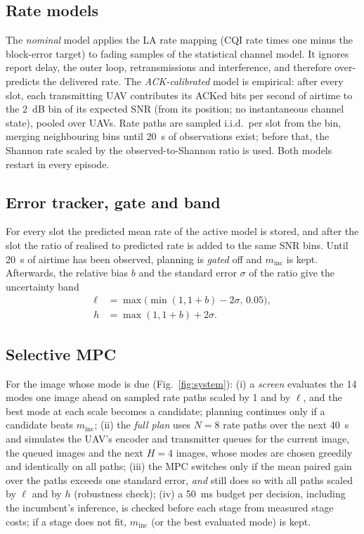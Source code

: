 \documentclass[final,3p,times,twocolumn]{elsarticle}
\begin{document}
\subsection{Rate models}
The \emph{nominal} model applies the LA rate mapping (CQI rate times one minus the block-error target) to fading
samples of the statistical channel model. It ignores report delay, the outer loop, retransmissions and interference,
and therefore over-predicts the delivered rate. The \emph{ACK-calibrated} model is empirical: after every slot, each
transmitting UAV contributes its ACKed bits per second of airtime to the \SI{2}{dB} bin of its expected SNR (from its
position; no instantaneous channel state), pooled over UAVs. Rate paths are sampled i.i.d.\ per slot from the bin,
merging neighbouring bins until \SI{20}{s} of observations exist; before that, the Shannon rate scaled by the
observed-to-Shannon ratio is used. Both models restart in every episode.

\subsection{Error tracker, gate and band}
For every slot the predicted mean rate of the active model is stored, and after the slot the ratio of realised to
predicted rate is added to the same SNR bins. Until \SI{20}{s} of airtime has been observed, planning is \emph{gated}
off and $m_{\mathrm{inc}}$ is kept. Afterwards, the relative bias $b$ and the standard error $\sigma$ of the ratio give
the uncertainty band
\begin{equation}\label{eq:band}
\begin{aligned}
\ell&=\max\big(\min(1,1{+}b)-2\sigma,\,0.05\big),\\
h&=\max(1,1{+}b)+2\sigma .
\end{aligned}
\end{equation}

\subsection{Selective MPC}
For the image whose mode is due (Fig.~\ref{fig:system}):
(i) a \emph{screen} evaluates the 14 modes one image ahead on sampled rate paths scaled by 1 and by $\ell$, and the
best mode at each scale becomes a candidate; planning continues only if a candidate beats $m_{\mathrm{inc}}$;
(ii) the \emph{full plan} uses $N{=}8$ rate paths over the next \SI{40}{s} and simulates the UAV's encoder and
transmitter queues for the current image, the queued images and the next $H{=}4$ images, whose modes are chosen
greedily and identically on all paths;
(iii) the MPC switches only if the mean paired gain over the paths exceeds one standard error, \emph{and} still does
so with all paths scaled by $\ell$ and by $h$ (robustness check);
(iv) a \SI{50}{ms} budget per decision, including the incumbent's inference, is checked before each stage from
measured stage costs; if a stage does not fit, $m_{\mathrm{inc}}$ (or the best evaluated mode) is kept.
\end{document}
